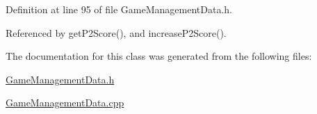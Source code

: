 Definition at line 95 of file Game\-Management\-Data.\-h.



Referenced by get\-P2\-Score(), and increase\-P2\-Score().



The documentation for this class was generated from the following files\-:\begin{DoxyCompactItemize}
\item 
\hyperlink{GameManagementData_8h}{Game\-Management\-Data.\-h}\item 
\hyperlink{GameManagementData_8cpp}{Game\-Management\-Data.\-cpp}\end{DoxyCompactItemize}
